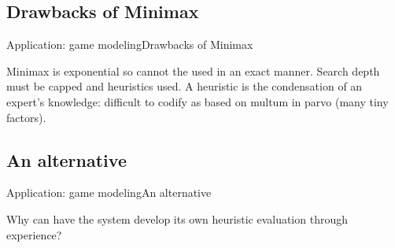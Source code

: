 \subsection{Drawbacks of Minimax}
\begin{frame}{Application: game modeling}{Drawbacks of Minimax}

Minimax is exponential so cannot the used in an exact manner. Search depth must 
be capped and heuristics used. A heuristic is the condensation of an expert's 
knowledge: difficult to codify as based on multum in parvo (many tiny factors).

\end{frame}

\subsection{An alternative}
\begin{frame}{Application: game modeling}{An alternative}

Why can have the system develop its own heuristic evaluation through experience?

\end{frame}